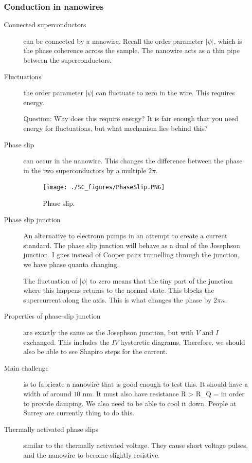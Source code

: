 \subsubsection{Conduction in nanowires}
\begin{description}
\item[Connected superconductors] can be connected by a nanowire. Recall the order parameter $|\psi|$, which is the phase coherence across the sample.  The nanowire acts as a thin pipe between the superconductors. 

\item[Fluctuations] the order parameter $|\psi|$ can fluctuate to zero in the wire. This requires energy. 

Question: Why does this require energy? It is fair enough that you need energy for fluctuations, but what mechanism lies behind this? 

\item[Phase slip] can occur in the nanowire. This changes the difference between the phase in the two superconductors by a multiple $2\pi$. 



\begin{figure}[h]
  \caption{Phase slip.}
  \centering
    \texttt{[image: ./SC\_figures/PhaseSlip.PNG]}
\end{figure}


\item[Phase slip junction] An alternative to electronn pumps in an attempt to create a current standard. The phase slip junction will behave as a dual of the Josephson junction. I gues instead of Cooper pairs tunnelling through the junction, we have phase quanta changing. 

The fluctuation of $|\psi|$ to zero means that the tiny part of the junction where this happens returns to the normal state. This blocks the supercurrent along the axis. This is what changes the phase by $2\pi n$. 

\item[Properties of phase-slip junction] are exactly the same as the Josephson junction, but with $V$ and $I$ exchanged. This includes the $IV$ hysteretic diagrams, Therefore, we should also be able to see Shapiro steps for the current. 

\item[Main challenge] is to fabricate a nanowire that is good enough to  test this. It should have a width of around $10 $ nm. It must also have resistance
\beq
R > R_Q = 
\eeq
in order to provide damping. We also need to be able to cool it down. People at Surrey are currently thing to do this. 

\item[Thermally activated phase slips] similar to the thermally activated voltage. 	They cause short voltage pulses, and the nanowire to become slightly resistive. 


\end{description}
